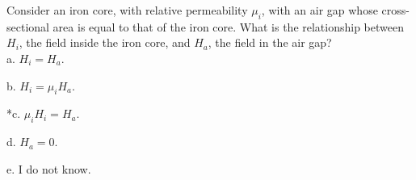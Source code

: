 
Consider an iron core, with relative permeability
\(\mu_i\), with an air gap whose cross-sectional area is equal to that of the iron
core. What is the relationship between \(H_i\), the field
inside the iron core, and \(H_a\), the field in the air gap?\\

a. \( H_i = H_a \).

b. \( H_i = \mu_i H_a \).

*c. \( \mu_i H_i = H_a \).

d. \( H_a = 0 \).

e. I do not know.\\
